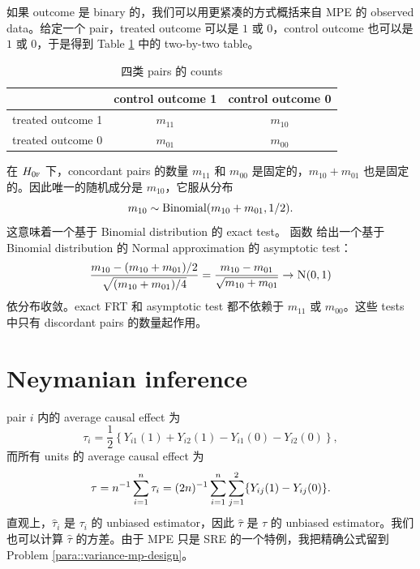  
 
 \begin{example}
 \label{eg::mcnenar-test-binary}
如果 outcome 是 binary 的，我们可以用更紧凑的方式概括来自 MPE 的 observed data。给定一个 pair，treated outcome 可以是 $1$ 或 $0$，control outcome 也可以是 $1$ 或 $0$，于是得到 Table \ref{tb::binarymatchedpairs} 中的 two-by-two table。
 
\begin{table}
\centering
\caption{四类 pairs 的 counts}\label{tb::binarymatchedpairs}
\begin{tabular}{ccc}
\hline 
 & control outcome 1 & control outcome 0\\
 \hline 
treated outcome 1 & $m_{11}$ & $m_{10}$ \\
treated outcome 0 & $m_{01}$ & $m_{00}$ \\
\hline 
\end{tabular}
\end{table} 
 
在 $H_{0\textsc{f}}$ 下，concordant pairs 的数量 $m_{11}$ 和 $m_{00}$ 是固定的，$m_{10} + m_{01}$ 也是固定的。因此唯一的随机成分是 $m_{10}$，它服从分布
$$
m_{10} \sim \textup{Binomial}( m_{10} + m_{01}, 1/2  ).
$$ 
这意味着一个基于 Binomial distribution 的 exact test。 函数  给出一个基于 Binomial distribution 的 Normal approximation 的 asymptotic test：
$$
\frac{   m_{10}  - (m_{10} + m_{01})/2  }{  \sqrt{  (m_{10} + m_{01}) / 4   } } 
= \frac{ m_{10}  -  m_{01}   }{  \sqrt{ m_{10} + m_{01}    }  }
\rightarrow \N01  
$$
依分布收敛。exact FRT 和 asymptotic test 都不依赖于 $m_{11}$ 或 $m_{00}$。这些 tests 中只有 discordant pairs 的数量起作用。
 \end{example}
 
 
 
\section{Neymanian inference}
 
pair $i$ 内的 average causal effect 为
 $$
 \tau_i = \frac{1}{2}  \left\{    Y_{i1}(1) + Y_{i2}(1) -     Y_{i1}(0)  - Y_{i2}(0)     \right\},
 $$
而所有 units 的 average causal effect 为
$$
\tau = n^{-1} \sum_{i=1}^n  \tau_i  = (2n)^{-1} \sum_{i=1}^n \sum_{j=1}^2 \{  Y_{ij}(1) - Y_{ij}(0)   \} .
$$
直观上，$\hat{\tau}_i $ 是 $ \tau_i $ 的 unbiased estimator，因此 $\hat{\tau}  $ 是 $\tau$ 的 unbiased estimator。我们也可以计算 $\hat{\tau}  $ 的方差。由于 MPE 只是 SRE 的一个特例，我把精确公式留到 Problem \ref{para::variance-mp-design}。


